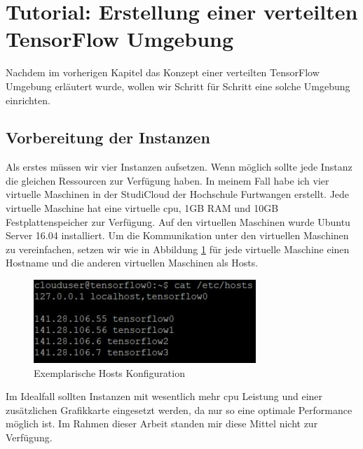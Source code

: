\section{Tutorial: Erstellung einer verteilten TensorFlow Umgebung}
Nachdem im vorherigen Kapitel das Konzept einer verteilten TensorFlow Umgebung erläutert wurde, wollen wir Schritt für Schritt eine solche Umgebung einrichten.

\subsection{Vorbereitung der Instanzen}
Als erstes müssen wir vier Instanzen aufsetzen. Wenn möglich sollte jede Instanz die gleichen Ressourcen zur Verfügung haben. In meinem Fall habe ich vier virtuelle Maschinen in der StudiCloud der Hochschule Furtwangen erstellt. Jede virtuelle Maschine hat eine virtuelle \ac{cpu}, 1GB RAM und 10GB Festplattenspeicher zur Verfügung. Auf den virtuellen Maschinen wurde Ubuntu Server 16.04 installiert. Um die Kommunikation unter den virtuellen Maschinen zu vereinfachen, setzen wir wie in Abbildung \ref{fig:hostkonfiguration} für jede virtuelle Maschine einen Hostname und die anderen virtuellen Maschinen als Hosts. 

\begin{figure}[h!]
	\centering
	\includegraphics[width=0.9\linewidth]{Pictures/HostKonfiguration}
	\caption[Hosts Konfiguration]{Exemplarische Hosts Konfiguration}
	\label{fig:hostkonfiguration}
\end{figure}

Im Idealfall sollten Instanzen mit wesentlich mehr \ac{cpu} Leistung und einer zusätzlichen Grafikkarte eingesetzt werden, da nur so eine optimale Performance möglich ist. Im Rahmen dieser Arbeit standen mir diese Mittel nicht zur Verfügung.

